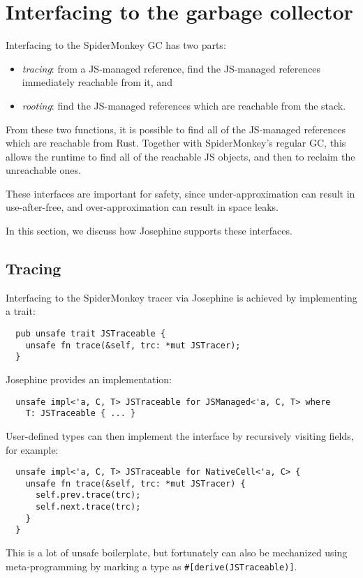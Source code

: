 \section{Interfacing to the garbage collector}

Interfacing to the SpiderMonkey GC has two parts:
\begin{itemize}

\item \emph{tracing}: from a JS-managed reference, find
  the JS-managed references immediately reachable from it, and

\item \emph{rooting}: find the JS-managed references which
  are reachable from the stack.

\end{itemize}
From these two functions, it is possible to find all of the
JS-managed references which are reachable from Rust. Together
with SpiderMonkey's regular GC, this allows the runtime to
find all of the reachable JS objects, and then to reclaim the
unreachable ones.

These interfaces are important for safety, since
under-approximation can result in use-after-free,
and over-approximation can result in space leaks.

In this section, we discuss how Josephine supports these interfaces.

\subsection{Tracing}

Interfacing to the SpiderMonkey tracer via Josephine is achieved
by implementing a trait:
\begin{verbatim}
  pub unsafe trait JSTraceable {
    unsafe fn trace(&self, trc: *mut JSTracer);
  }
\end{verbatim}
Josephine provides an implementation:
\begin{verbatim}
  unsafe impl<'a, C, T> JSTraceable for JSManaged<'a, C, T> where
    T: JSTraceable { ... }
\end{verbatim}
User-defined types can then implement the interface by
recursively visiting fields, for example:
\begin{verbatim}
  unsafe impl<'a, C, T> JSTraceable for NativeCell<'a, C> {
    unsafe fn trace(&self, trc: *mut JSTracer) {
      self.prev.trace(trc);
      self.next.trace(trc);
    }
  }
\end{verbatim}
This is a lot of unsafe boilerplate, but fortunately can
also be mechanized using meta-programming by marking a type
as \verb|#[derive(JSTraceable)]|.

